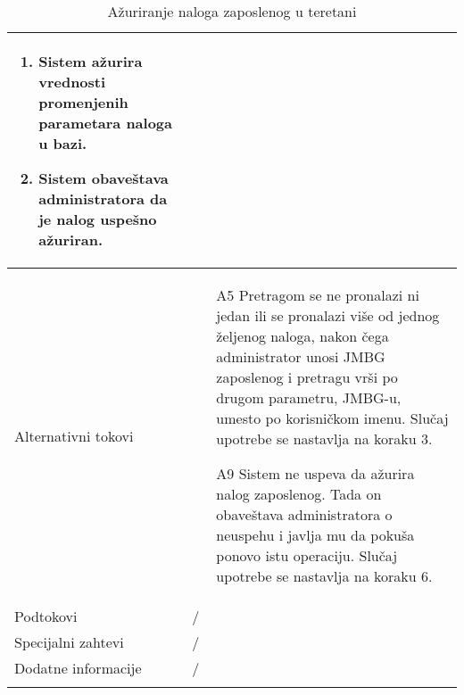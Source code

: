 \documentclass[../main.tex]{subfiles}
\begin{document}
\begin{longtable}{| p{} | p{} |}
\begin{enumerate}
        \item Sistem ažurira vrednosti promenjenih parametara naloga u bazi.
        \item Sistem obaveštava administratora da je nalog uspešno ažuriran.
    \end{enumerate}\\
\hline
    Alternativni tokovi & \begin{itemize}
        \item[A5]  Pretragom se ne pronalazi ni jedan ili se pronalazi više od jednog željenog naloga, nakon čega administrator unosi JMBG zaposlenog i pretragu vrši po drugom parametru, JMBG-u, umesto po korisničkom imenu. Slučaj upotrebe se nastavlja na koraku 3.
        \item[A9]  Sistem ne uspeva da ažurira nalog zaposlenog. Tada on obaveštava administratora o neuspehu i javlja mu da pokuša ponovo istu operaciju. Slučaj upotrebe se nastavlja na koraku 6.

    \end{itemize}\\
\hline
    Podtokovi & /\\
\hline
    Specijalni zahtevi & /\\
\hline
    Dodatne informacije & /\\
\hline
\caption{Ažuriranje naloga zaposlenog u teretani} %
\end{longtable}
\end{document}
